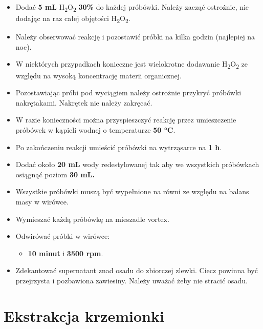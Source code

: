 \documentclass[
  letterpaper,
  DIV=11,
  numbers=noendperiod]{scrreprt}
\providecommand{\tightlist}{%
  \setlength{\itemsep}{0pt}\setlength{\parskip}{0pt}}\usepackage{longtable,booktabs,array}
\begin{document}
\begin{itemize}
\tightlist
\item
  Dodać \textbf{5 mL} H\textsubscript{2}O\textsubscript{2} \textbf{30\%}
  do każdej próbówki. Należy zacząć ostrożnie, nie dodając na raz całej
  objętości H\textsubscript{2}O\textsubscript{2}.
\item
  Należy obserwować reakcję i pozostawić próbki na kilka godzin
  (najlepiej na noc).
\item
  W niektórych przypadkach konieczne jest wielokrotne dodawanie
  H\textsubscript{2}O\textsubscript{2} ze względu na wysoką koncentrację
  materii organicznej.
\item
  Pozostawiając próbi pod wyciągiem należy ostrożnie przykryć próbówki
  nakrętakami. Nakrętek nie należy zakręcać.
\item
  W razie konieczności można przyspieszczyć reakcję przez umieszczenie
  próbówek w kąpieli wodnej o temperaturze \textbf{50 °C}.
\item
  Po zakończeniu reakcji umieścić próbówki na wytrząsarce na \textbf{1
  h}.
\item
  Dodać około \textbf{20 mL} wody redestylowanej tak aby we wszystkich
  próbówkach osiągnąć poziom \textbf{30 mL.}
\item
  Wszystkie próbówki muszą być wypełnione na równi ze względu na balans
  masy w wirówce.
\item
  Wymieszać każdą próbówkę na mieszadle vortex.
\item
  Odwirówać próbki w wirówce:

  \begin{itemize}
  \tightlist
  \item
    \textbf{10 minut} i \textbf{3500 rpm}.
  \end{itemize}
\item
  Zdekantować supernatant znad osadu do zbiorczej zlewki. Ciecz powinna
  być przejrzysta i pozbawiona zawiesiny. Należy uważać żeby nie stracić
  osadu.
\end{itemize}

\hypertarget{ekstrakcja-krzemionki}{%
\section{Ekstrakcja krzemionki}\label{ekstrakcja-krzemionki}}
\end{document}
